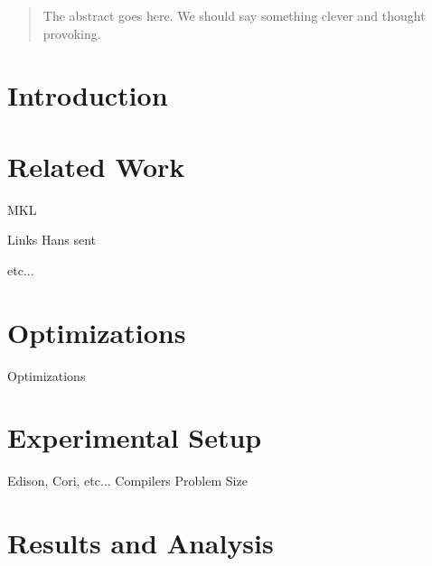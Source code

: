 \documentclass[conference]{IEEEtran}
\begin{document}
\begin{abstract}
The abstract goes here. We should say something clever and thought provoking.
\end{abstract}



%
\IEEEpeerreviewmaketitle



\section{Introduction}
% 

\section{Related Work}
MKL

Links Hans sent

etc...

\section{Optimizations}
Optimizations

\section{Experimental Setup}
Edison, Cori, etc...
Compilers
Problem Size

\section{Results and Analysis}

\end{document}
